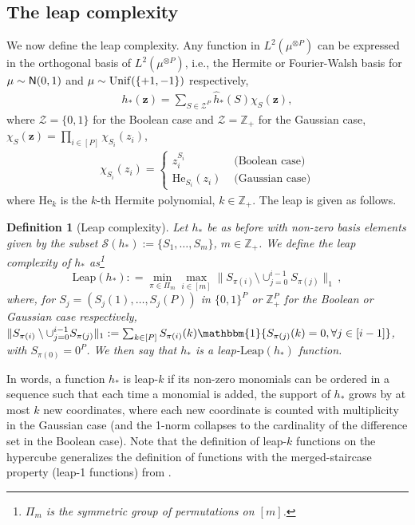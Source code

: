 \documentclass[11pt]{article}
\newcommand{\<}{\langle}
\renewcommand{\>}{\rangle}
\newtheorem{definition}{Definition}
\theoremstyle{definition}
\def\bz{{\boldsymbol z}}
\def\Unif{{\rm Unif}}
\def\cS{{\mathcal S}}
\def\Unif{{\sf Unif}}
\def\normal{{\sf N}}
\def\normal{{\sf N}}
\def\Unif{{\sf Unif}}
\def\normal{{\sf N}}
\def\bz{{\boldsymbol z}}
\def\Unif{{\rm Unif}}
\def\bz{{\boldsymbol z}}
\def\normal{{\sf N}}
\def\cS{{\mathcal S}}
\def\ind{\mathbbm{1}}
\begin{document}
\subsection{The leap complexity}\label{sec:leap}
We now define the leap complexity. Any function in $L^2 (\mu^{\otimes P})$ can be expressed in the orthogonal basis of $L^2 (\mu^{\otimes P})$, i.e., the Hermite or Fourier-Walsh basis for $\mu \sim \normal (0,1)$ and $\mu \sim \Unif (\{+1,-1\})$ respectively, 
\begin{align}\label{eq:decompo_monomials}
h_*(\bz) =\sum_{S \in \mathcal{Z}^P} \hat{h}_*(S) \chi_S(\bz),
\end{align}
where $\mathcal{Z}=\{0,1\}$ for the Boolean case and $\mathcal{Z}=\mathbb{Z}_+$ for the Gaussian case, $\chi_S(\bz) = \prod_{i \in [P]} \chi_{S_i}(z_i)$, 
\begin{align}
\chi_{S_i}(z_i) =\begin{cases}
z_i^{S_i} &\text{ (Boolean case)}\\
\mathrm{He}_{S_i}(z_i) & \text{ (Gaussian case)}
\end{cases}
\end{align}
where $\mathrm{He}_k$ is the $k$-th Hermite polynomial, $k \in \mathbb{Z}_+$. The leap is given as follows.
\begin{definition}[Leap complexity] \label{def:leap_general} Let $h_*$ be as before with non-zero basis elements given by the subset $\cS (h_*) := \{ S_1 , \ldots , S_m \}$, $m \in \mathbb{Z}_+$. We define the leap complexity of $h_*$ as\footnote{$\Pi_{m}$ is the symmetric group of permutations on $[m]$.} 
\[
\mathrm{Leap}(h_*) : = \min_{\pi \in \Pi_{m}} \max_{i \in [m]} \big\| S_{\pi (i)}\setminus \cup_{j=0}^{i-1} S_{\pi(j)} \big\|_1 \,,
\]
where, for $S_j = (S_j(1) , \ldots , S_j(P) )$ in $\{0,1\}^P$ or $\mathbb{Z}_+^P$ for the Boolean or Gaussian case respectively, 
$\| S_{\pi (i)}\setminus \cup_{j=0}^{i-1} S_{\pi(j)} \|_1 := \sum_{k \in [P]} S_{\pi(i)}(k) \ind \{S_{\pi(j)}(k) = 0, \forall j \in [i-1] \}$, 
with $S_{\pi(0)}=0^P$. We then say that $h_*$ is a leap-$\mathrm{Leap}(h_*)$ function.
\end{definition}
In words, a function $h_*$ is leap-$k$ if its non-zero monomials can be ordered in a sequence such that each time a monomial is added, the support of $h_*$ grows by at most $k$ new coordinates, where each new coordinate is counted with multiplicity in the Gaussian case (and the 1-norm collapses to the cardinality of the difference set in the Boolean case). Note that the definition of leap-$k$ functions on the hypercube generalizes the definition of functions with the merged-staircase property (leap-1 functions) from \cite{abbe2022merged}. 
\end{document}
